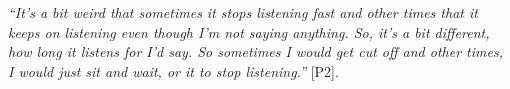             \textit{``It's a bit weird that sometimes it stops listening fast and other times that it keeps on listening even though I'm not saying anything. So, it's a bit different, how long it listens for I'd say. So sometimes I would get cut off and other times, I would just sit and wait, or it to stop listening.''}
            [P2].
        
            


